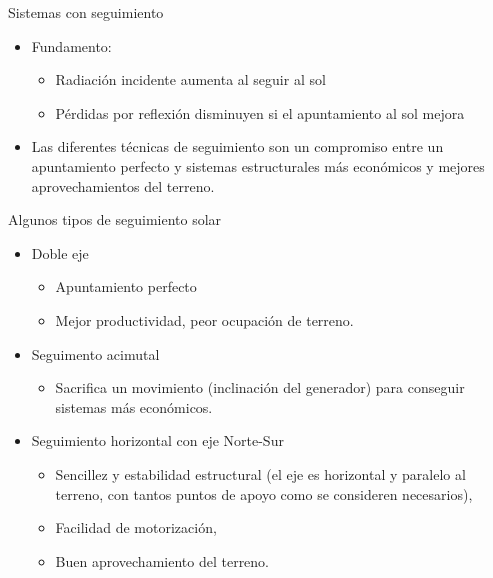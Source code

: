 \documentclass[xcolor={usenames,svgnames,dvipsnames}]{beamer}
\begin{document}
\begin{frame}[label={sec:orgf9ecd70}]{Sistemas con seguimiento}
\begin{itemize}[<+->]
\item \alert{Fundamento:}
\begin{itemize}[<.->]
\item Radiación incidente aumenta al seguir al sol

\item Pérdidas por reflexión disminuyen si el apuntamiento al sol mejora
\end{itemize}

\item Las diferentes técnicas de seguimiento son un compromiso entre un
apuntamiento perfecto y sistemas estructurales más económicos y
mejores aprovechamientos del terreno.
\end{itemize}
\end{frame}

\begin{frame}[label={sec:org1e51bf9}]{Algunos tipos de seguimiento solar}
\begin{itemize}[<+->]
\item \alert{Doble eje}
\begin{itemize}[<.->]
\item Apuntamiento \guillemotleft{}perfecto\guillemotright{}

\item Mejor productividad, peor ocupación de terreno.
\end{itemize}

\item \alert{Seguimento acimutal}
\begin{itemize}[<.->]
\item Sacrifica un movimiento (inclinación del generador) para conseguir
sistemas más económicos.
\end{itemize}

\item \alert{Seguimiento horizontal con eje Norte-Sur}
\begin{itemize}[<.->]
\item Sencillez y estabilidad estructural (el eje es horizontal y
paralelo al terreno, con tantos puntos de apoyo como se consideren
necesarios),

\item Facilidad de motorización,

\item Buen aprovechamiento del terreno.
\end{itemize}
\end{itemize}
\end{frame}
\end{document}

